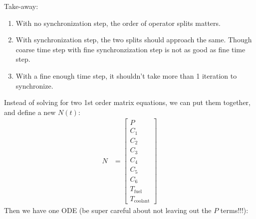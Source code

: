 \documentclass{school-22.211-notes}
\begin{document}
Take-away: 
\begin{enumerate}
\item With no synchronization step, the order of operator splits matters. 
\item With synchronization step, the two splits should approach the same. Though coarse time step with fine synchronzization step is not as good as fine time step. 
\item With a fine enough time step, it shouldn't take more than 1 iteration to synchronize. 
\end{enumerate}


\clearpage
{}
Instead of solving for two 1st order matrix equations, we can put them together, and define a new $N(t)$: 
\begin{align}
N &= \left[ \begin{array}{c} P \\ C_1 \\ C_2 \\ C_3 \\ C_4 \\ C_5 \\ C_6 \\ T_{\mathrm{fuel}} \\ T_{\mathrm{coolant}} \end{array} \right]  
\end{align}
Then we have one ODE (be super careful about not leaving out the $P$ terms!!!): 
\end{document}
